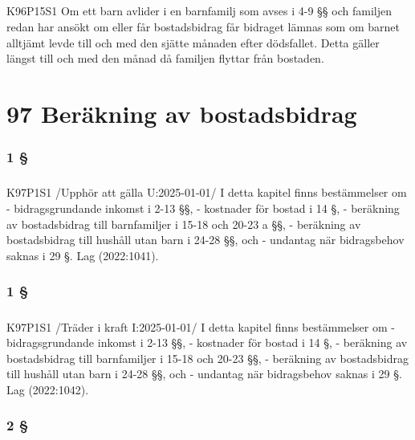 \documentclass[a4paper,notitlepage,openany,10pt]{book}
\begin{document}
\paragraph*{}
{\tiny K96P15S1}
Om ett barn avlider i en barnfamilj som avses i 4-9 §§ och familjen redan har ansökt om eller får bostadsbidrag får bidraget lämnas som om barnet alltjämt levde till och med den sjätte månaden efter dödsfallet. Detta gäller längst till och med den månad då familjen flyttar från bostaden.
\chapter*{97 Beräkning av bostadsbidrag}
\subsection*{1 §}
\paragraph*{}
{\tiny K97P1S1}
/Upphör att gälla U:2025-01-01/
I detta kapitel finns bestämmelser om
\newline - bidragsgrundande inkomst i 2-13 §§,
\newline - kostnader för bostad i 14 §,
\newline - beräkning av bostadsbidrag till barnfamiljer i 15-18 och 20-23 a §§,
\newline - beräkning av bostadsbidrag till hushåll utan barn i 24-28 §§, och
\newline - undantag när bidragsbehov saknas i 29 §.
Lag (2022:1041).
\subsection*{1 §}
\paragraph*{}
{\tiny K97P1S1}
/Träder i kraft I:2025-01-01/
I detta kapitel finns bestämmelser om
\newline - bidragsgrundande inkomst i 2-13 §§,
\newline - kostnader för bostad i 14 §,
\newline - beräkning av bostadsbidrag till barnfamiljer i 15-18 och 20-23 §§,
\newline - beräkning av bostadsbidrag till hushåll utan barn i 24-28 §§, och
\newline - undantag när bidragsbehov saknas i 29 §.
Lag (2022:1042).
\subsection*{2 §}
\end{document}
